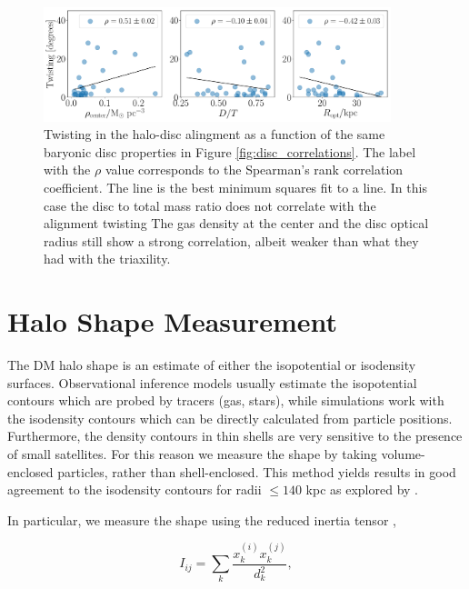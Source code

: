 \documentclass[usenatbib]{mnras}
\begin{document}
\begin{figure}
\begin{center}
\includegraphics[width=0.9\textwidth]{correlations_angles_alignment_MHD.pdf}
\end{center}
\caption{Twisting in the halo-disc alingment as a function of the same
  baryonic disc properties in Figure \ref{fig:disc_correlations}.
  The label with the $\rho$ value corresponds to the Spearman's rank
  correlation coefficient.
  The line is the best minimum squares fit to a line.
  In this case the disc to total mass ratio does not correlate with the alignment twisting
  The gas density at the center and the disc optical radius still show
  a strong correlation, albeit weaker than what they had with the triaxility.}
\label{fig:alignment_correlations2}
\end{figure}




\section{Halo Shape Measurement}
\label{sec:method}

The DM halo shape is an estimate of either the isopotential or
isodensity surfaces.   
Observational inference models usually estimate the 
isopotential contours which are probed by tracers (gas, stars), while
simulations work with the isodensity contours which can be directly
calculated from particle positions.  
Furthermore, the density contours in thin shells are very sensitive to
the presence of small satellites.  
For this reason we measure the shape by taking
volume-enclosed particles, rather than shell-enclosed.  
This method yields results in good agreement to the isodensity
contours for radii $\leq 140$ kpc as explored by
\citep{VeraCiro11}.  


In particular, we measure the shape using the reduced inertia tensor
\citep{Allgood06},  

\begin{equation}
I_{ij} = \sum_k \frac{x_k^{(i)}x_k^{(j)}}{d^2_k},
\label{eq:inertia}
\end{equation}
\end{document}
